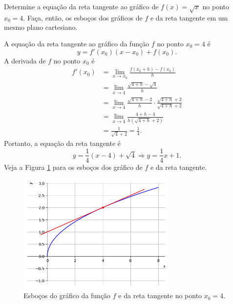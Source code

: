 \begin{exeresol}
  Determine a equação da reta tangente ao gráfico de $f(x) = \sqrt{x}$ no ponto $x_0=4$. Faça, então, os esboços dos gráficos de $f$ e da reta tangente em um mesmo plano cartesiano.
\end{exeresol}
\begin{resol}
  A equação da reta tangente ao gráfico da função $f$ no ponto $x_0=4$ é
  \begin{equation}
    y = f'(x_0)(x-x_0)+f(x_0).
  \end{equation}
  A derivada de $f$ no ponto $x_0$ é
  \begin{align}
    f'(x_0) &= \lim_{x\to x_0} \frac{f(x_0+h)-f(x_0)}{h}\\
            &= \lim_{x\to 4} \frac{\sqrt{4+h}-\sqrt{4}}{h}\\
            &= \lim_{x\to 4} \frac{\sqrt{4+h}-2}{h} \cdot \frac{\sqrt{4+h}+2}{\sqrt{4+h}+2}\\
            &= \lim_{x\to 4} \frac{4+h-4}{h(\sqrt{4+h}+2)}\\
            &= \frac{1}{\sqrt{4}+2} = \frac{1}{4}.
  \end{align}
  Portanto, a equação da reta tangente é
  \begin{equation}
    y = \frac{1}{4}(x-4)+\sqrt{4} \Rightarrow y = \frac{1}{4}x+1.
  \end{equation}
  Veja a Figura \ref{fig:cap_deriv_exeresol_rt_sqrt} para os esboços dos gráfico de $f$ e da reta tangente.

  \begin{figure}[H]
    \centering
    \includegraphics[width=0.7\textwidth]{./cap_deriv/dados/fig_cap_deriv_exeresol_rt_sqrt/fig_cap_deriv_exeresol_rt_sqrt}
    \caption{Esboços do gráfico da função $f$ e da reta tangente no ponto $x_0=4$.}
    \label{fig:cap_deriv_exeresol_rt_sqrt}
  \end{figure}
\end{resol}

